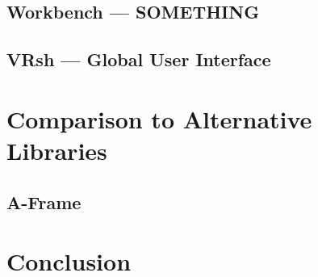 \documentclass[conference,12pt]{IEEEtran}
\newcommand\name{VRsh}
\begin{document}
\subsection{Workbench --- SOMETHING} %

\subsection{{\name} --- Global User Interface}

\section{Comparison to Alternative Libraries}

\subsection{A-Frame}

\section{Conclusion}

{\printbibliography}
\end{document}
